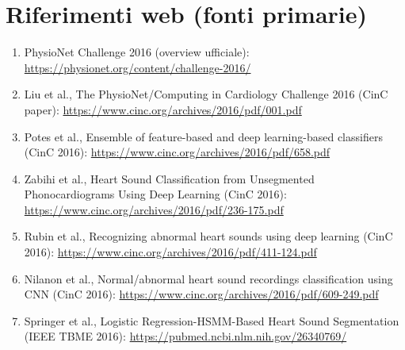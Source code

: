\documentclass[12pt,a4paper]{article}
\begin{document}
\section*{Riferimenti web (fonti primarie)}
\begin{enumerate}[leftmargin=*,label=\arabic*.]
    \item PhysioNet Challenge 2016 (overview ufficiale): \url{https://physionet.org/content/challenge-2016/}
    \item Liu et al., The PhysioNet/Computing in Cardiology Challenge 2016 (CinC paper): \url{https://www.cinc.org/archives/2016/pdf/001.pdf}
    \item Potes et al., Ensemble of feature-based and deep learning-based classifiers (CinC 2016): \url{https://www.cinc.org/archives/2016/pdf/658.pdf}
    \item Zabihi et al., Heart Sound Classification from Unsegmented Phonocardiograms Using Deep Learning (CinC 2016): \url{https://www.cinc.org/archives/2016/pdf/236-175.pdf}
    \item Rubin et al., Recognizing abnormal heart sounds using deep learning (CinC 2016): \url{https://www.cinc.org/archives/2016/pdf/411-124.pdf}
    \item Nilanon et al., Normal/abnormal heart sound recordings classification using CNN (CinC 2016): \url{https://www.cinc.org/archives/2016/pdf/609-249.pdf}
    \item Springer et al., Logistic Regression-HSMM-Based Heart Sound Segmentation (IEEE TBME 2016): \url{https://pubmed.ncbi.nlm.nih.gov/26340769/}
\end{enumerate}
\end{document}
